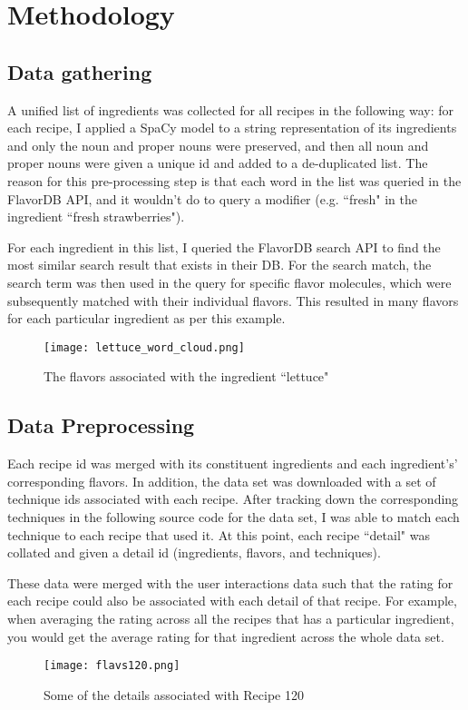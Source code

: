 \documentclass{article}
\begin{document}
\section{Methodology}

\subsection{Data gathering}

A unified list of ingredients was collected for all recipes in the following way: for each recipe, I applied a SpaCy model to a string representation of its ingredients and only the noun and proper nouns were preserved, and then all noun and proper nouns were given a unique id and added to a de-duplicated list. The reason for this pre-processing step is that each word in the list was queried in the FlavorDB API, and it wouldn't do to query a modifier (e.g. ``fresh" in the ingredient ``fresh strawberries"). 

For each ingredient in this list, I queried the FlavorDB search API to find the most similar search result that exists in their DB. For the search match, the search term was then used in the query for specific flavor molecules, which were subsequently matched with their individual flavors. This resulted in many flavors for each particular ingredient as per this example.

\begin{figure}[h]
    \centering
    \texttt{[image: lettuce\_word\_cloud.png]}
    \caption{The flavors associated with the ingredient ``lettuce"}
    \label{fig:lettuce_word_cloud}
\end{figure}


\subsection{Data Preprocessing}

Each recipe id was merged with its constituent ingredients and each ingredient's' corresponding flavors. In addition, the data set was downloaded with a set of technique ids associated with each recipe. After tracking down the corresponding techniques in the following source code for the data set, I was able to match each technique to each recipe that used it. At this point, each recipe ``detail" was collated and given a detail id (ingredients, flavors, and techniques). 

These data were merged with the user interactions data such that the rating for each recipe could also be associated with each detail of that recipe. For example, when averaging the rating across all the recipes that has a particular ingredient, you would get the average rating for that ingredient across the whole data set. \begin{figure}[H]
    \centering
    \texttt{[image: flavs120.png]}
    \caption{Some of the details associated with Recipe 120}
    \label{fig:flavs120}
\end{figure}
\end{document}
